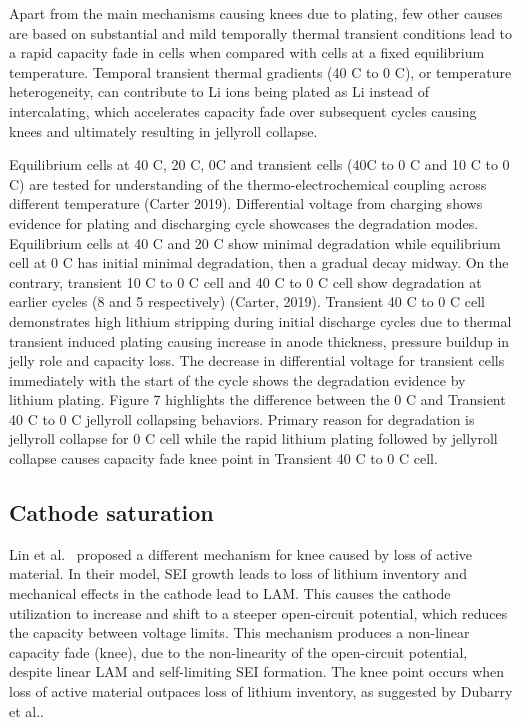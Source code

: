 \documentclass[journal=jpcl, manuscript=article, layout=onecolumn]{achemso}
\newcommand{\pbox}[1]{{
\fbox{
\parbox{0.8\textwidth}{  \fbox{$\triangleright$\textcolor{blue}{\textbf{From Peter}:}} 
#1
}}}}
\begin{document}
Apart from the main mechanisms causing knees due to plating, few other causes are based on substantial and mild temporally thermal transient conditions lead to a rapid capacity fade in cells when compared with cells at a fixed equilibrium temperature. Temporal transient thermal gradients (40 \degree C to 0 \degree C), or temperature heterogeneity, can contribute to Li ions being plated as Li instead of intercalating, which accelerates capacity fade over subsequent cycles causing knees and ultimately resulting in jellyroll collapse.

Equilibrium cells at 40 \degree C, 20 \degree C, 0\degree C and transient cells (40\degree C to 0 \degree C and 10 \degree C to 0 \degree C) are tested for understanding of the thermo-electrochemical coupling across different temperature (Carter 2019). Differential voltage from charging shows evidence for plating and discharging cycle showcases the degradation modes. Equilibrium cells at 40 \degree C and 20 \degree C show minimal degradation while equilibrium cell at 0 \degree C has initial minimal degradation, then a gradual decay midway. On the contrary, transient 10 \degree C to 0 \degree C cell and 40 \degree C to 0 \degree C cell show degradation at earlier cycles (8 and 5 respectively) (Carter, 2019). Transient 40 \degree C to 0 \degree C cell demonstrates high lithium stripping during initial discharge cycles due to thermal transient induced plating causing increase in anode thickness, pressure buildup in jelly role and capacity loss. The decrease in differential voltage for transient cells immediately with the start of the cycle shows the degradation evidence by lithium plating.  Figure 7 highlights the difference between the 0 \degree C and Transient 40 \degree C to 0 \degree C jellyroll collapsing behaviors. Primary reason for degradation is jellyroll collapse for 0 \degree C cell while the rapid lithium plating followed by jellyroll collapse causes capacity fade knee point in Transient 40 \degree C to 0 \degree C cell. 

\subsection{Cathode saturation}

\pbox{Tino: Let's work on this section together}

Lin et al.~\cite{lin_comprehensive_2013} proposed a different mechanism for knee caused by loss of active material. In their model, SEI growth leads to loss of lithium inventory and mechanical effects in the cathode lead to LAM. This causes the cathode utilization to increase and shift to a steeper open-circuit potential, which reduces the capacity between voltage limits. This mechanism produces a non-linear capacity fade (knee), due to the non-linearity of the open-circuit potential, despite linear LAM and self-limiting SEI formation. The knee point occurs when loss of active material outpaces loss of lithium inventory, as suggested by Dubarry et al.\cite{dubarry_durability_2018}.
\end{document}
